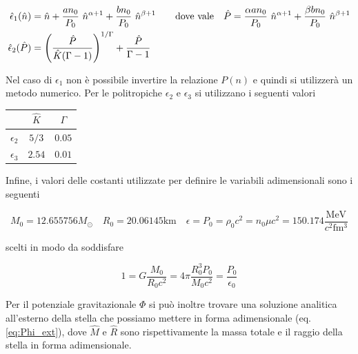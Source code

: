 \documentclass[a4paper, titlepage]{article}
\newcommand{\Punit}[0]{\frac{\unit{\mega\electronvolt}}{c^2 \unit{\femto\cubic\meter}}}
\begin{document}
\begin{subequations}
\begin{align}
    \hat \epsilon_1 (\hat n) &= \hat n + \frac{a n_0}{P_0} ~ \hat n^{\alpha + 1}
    + \frac{b n_0}{P_0} ~ \hat n^{\beta + 1}
    \quad \quad {\rm dove~vale} \quad
    \hat P = \frac{\alpha a n_0}{P_0} ~ \hat n^{\alpha + 1}
    + \frac{\beta b n_0}{P_0} ~ \hat n^{\beta + 1} \label{eq:e1_ad} \\
    \hat \epsilon_2 (\hat P)
    &= \left(\frac{\hat P}{\hat K (\Gamma - 1)} \right)^{1/\Gamma}
    + \frac{\hat P}{\Gamma - 1} \label{eq:e23_ad}
\end{align}
\end{subequations}

Nel caso di $\epsilon_1$ non è possibile invertire la relazione $P(n)$ e quindi
si utilizzerà un metodo numerico.
Per le politropiche $\epsilon_2$ e $\epsilon_3$ si utilizzano i seguenti valori

\begin{table}[h]
    \centering
    \begin{tabular}{c|c|c} 
         & $\hat K$ & $\Gamma$ \\
        \hline
        $\epsilon_2$ & $5 / 3$ & $0.05$ \\
        \hline
        $\epsilon_3$ & $2.54$ & $0.01$ \\
    \end{tabular}
\end{table}

Infine, i valori delle costanti utilizzate per definire le variabili
adimensionali sono i seguenti

\begin{equation}
    M_0 = 12.655756 M_\odot \quad R_0 = 20.06145 \unit{\kilo\meter} \quad
    \epsilon = P_0 = \rho_0 c^2 = n_0 \mu c^2 = 150.174 \Punit
    \label{eq:val_cost}
\end{equation}

scelti in modo da soddisfare

\begin{equation}
    1 = G \frac{M_0}{R_0 c^2} = 4 \pi \frac{R_0^3 P_0}{M_0 c^2}
    = \frac{P_0}{\epsilon_0}
\end{equation}

Per il potenziale gravitazionale $\Phi$ si può inoltre trovare una soluzione
analitica all'esterno della stella che possiamo mettere in forma adimensionale
(eq. \ref{eq:Phi_ext}), dove $\hat{M}$ e $\hat R$ sono rispettivamente la massa
totale e il raggio della stella in forma adimensionale.
\end{document}
